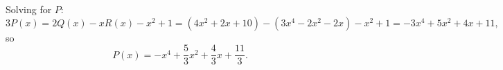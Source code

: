 Solving for $P$:
\[3P(x)=2Q(x)-xR(x)-x^2+1=\left(4x^2+2x+10\right)-\left(3x^4-2x^2-2x\right)-x^2+1=-3x^4+5x^2+4x+11,\]
so
\[P(x)=\boxed{-x^4+\dfrac53x^2+\dfrac43x+\dfrac{11}{3}}.\]
